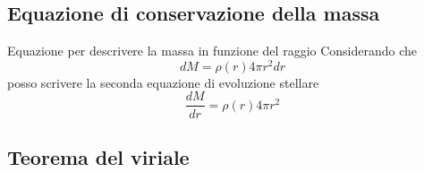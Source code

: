 \documentclass[a4paper,11pt]{report}
\theoremstyle{remark}
\theoremstyle{definition}
\begin{document}
\subsection{Equazione di conservazione della massa}

Equazione per descrivere la massa in funzione del raggio \newline
Considerando che 
\begin{equation*}
    dM = \rho(r) 4 \pi r^2 dr
\end{equation*}
posso scrivere la seconda equazione di evoluzione stellare
\begin{equation}
    \frac{dM}{dr} = \rho(r) 4 \pi r^2
\end{equation}

\subsection{Teorema del viriale}
\end{document}

